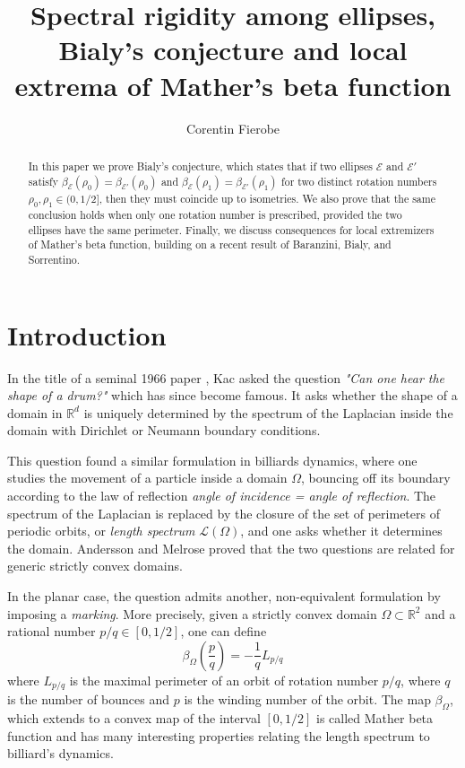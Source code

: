 \documentclass[a4paper]{article}
\theoremstyle{definition}
\def\R{\mathbb{R}}
\begin{document}
\title{Spectral rigidity among ellipses, Bialy's conjecture and local extrema of Mather's beta function}
\author{Corentin Fierobe}
\date{}
\maketitle


\begin{abstract}
In this paper we prove Bialy's conjecture, which states that if two ellipses $\mathscr E$ and $\mathscr E'$ satisfy 
$\beta_{\mathscr E}(\rho_0)=\beta_{\mathscr E'}(\rho_0)$ and $\beta_{\mathscr E}(\rho_1)=\beta_{\mathscr E'}(\rho_1)$ 
for two distinct rotation numbers $\rho_0,\rho_1\in(0,1/2]$, then they must coincide up to isometries. 
We also prove that the same conclusion holds when only one rotation number is prescribed, provided the two ellipses have the same perimeter. 
Finally, we discuss consequences for local extremizers of Mather's beta function, building on a recent result of Baranzini, Bialy, and Sorrentino.
\end{abstract}

\section{Introduction}

In the title of a seminal 1966 paper \cite{Kac}, Kac asked the question \textit{"Can one hear the shape of a drum?"} which has since become famous. It asks whether the shape of a domain in $\R^d$ is uniquely determined by the spectrum of the Laplacian inside the domain with Dirichlet or Neumann boundary conditions.

This question found a similar formulation in billiards dynamics, where one studies the movement of a particle inside a domain $\Omega$, bouncing off its boundary according to the law of reflection \textit{angle of incidence = angle of reflection}. The spectrum of the Laplacian is replaced by the closure of the set of perimeters of periodic orbits, or \textit{length spectrum} $\mathscr L(\Omega)$, and one asks whether it determines the domain. Andersson and Melrose \cite{AM} proved that the two questions are related for generic strictly convex domains.

In the planar case, the question admits another, non-equivalent formulation by imposing a \textit{marking}. More precisely, given a strictly convex domain $\Omega\subset\R^2$ and a rational number $p/q\in[0,1/2]$, one can define
\[
\beta_{\Omega}\left(\frac{p}{q}\right) = -\frac{1}{q}L_{p/q}  
\]
where $L_{p/q}$ is the maximal perimeter of an orbit of rotation number $p/q$, where $q$ is the number of bounces and $p$ is the winding number of the orbit. The map $\beta_{\Omega}$, which extends to a convex map of the interval $[0,1/2]$ is called Mather beta function and has many interesting properties relating the length spectrum to billiard's dynamics. 
\end{document}
